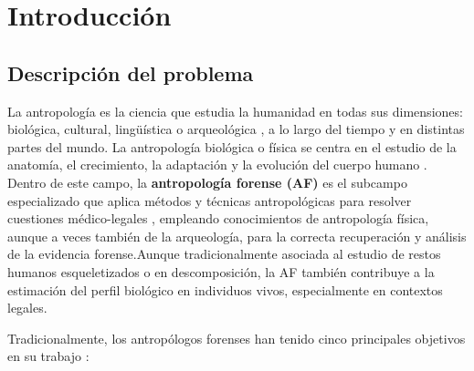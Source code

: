 
\chapter{Introducción}


\section{Descripción del problema}

La antropología es la ciencia que estudia la humanidad en todas sus dimensiones: biológica, cultural, lingüística o arqueológica \cite{AAA2022AnthropologyDefinition}, a lo largo del tiempo y en distintas partes del mundo. La antropología biológica o física se centra en el estudio de la anatomía, el crecimiento, la adaptación y la evolución del cuerpo humano \cite{nawrocki2006}. Dentro de este campo, la \textbf{antropología forense (AF)} es el subcampo especializado que aplica métodos y técnicas antropológicas para resolver cuestiones médico-legales \cite{nawrocki2006}, empleando conocimientos de antropología física, aunque a veces también de la arqueología, para la correcta recuperación y análisis de la evidencia forense.Aunque tradicionalmente asociada al estudio de restos humanos esqueletizados o en descomposición, la AF también contribuye a la estimación del perfil biológico en individuos vivos, especialmente en contextos legales.

Tradicionalmente, los antropólogos forenses han tenido cinco principales objetivos en su trabajo \cite{byers2023}:

